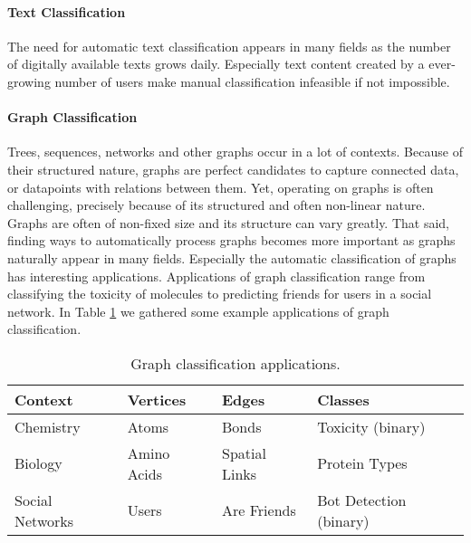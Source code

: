 
\paragraph{Text Classification}
The need for automatic text classification appears in many fields as the number of digitally available texts grows daily.
Especially text content created by a ever-growing number of users make manual classification infeasible if not impossible.


\paragraph{Graph Classification}
Trees, sequences, networks and other graphs occur in a lot of contexts.
Because of their structured nature, graphs are perfect candidates to capture connected data, or datapoints with relations between them.
Yet, operating on graphs is often challenging, precisely because of its structured and often non-linear nature.
Graphs are often of non-fixed size and its structure can vary greatly.
That said, finding ways to automatically process graphs becomes more important as graphs naturally appear in many fields.
Especially the automatic classification of graphs has interesting applications.
Applications of graph classification range from classifying the toxicity of molecules to predicting friends for users in a social network.
In Table \ref{table:graph_classification_examples} we gathered some example applications of graph classification.

\begin{table}[htb!]
\centering
\renewcommand*{\arraystretch}{0.95}
\begin{tabular}{llll}
Context & Vertices & Edges & Classes \\
\midrule
Chemistry & Atoms & Bonds & Toxicity (binary) \\
Biology & Amino Acids & Spatial Links & Protein Types \\ 
Social Networks & Users & Are Friends & Bot Detection (binary) \\
\bottomrule
\end{tabular}%
\caption[Table: Graph Classification Applications]{Graph classification applications.}%
\label{table:graph_classification_examples}
\end{table}

